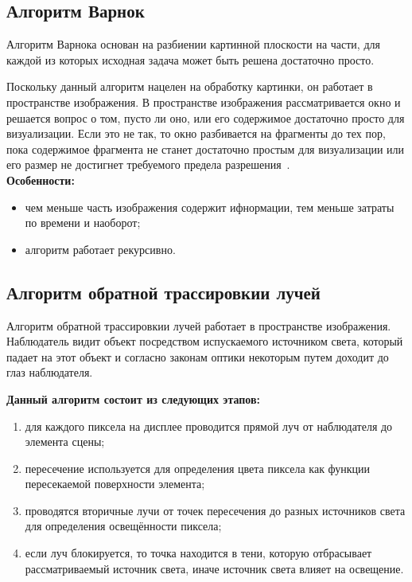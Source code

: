 \subsection{Алгоритм Варнок}

Алгоритм Варнока основан на разбиении картинной плоскости на части, для каждой из которых 
исходная задача может быть решена достаточно просто.

Поскольку данный алгоритм нацелен на обработку картинки, он работает в пространстве изображения. 
В пространстве изображения рассматривается окно и решается вопрос о том, пусто ли оно, или его содержимое 
достаточно просто для визуализации. Если это не так, то окно разбивается на фрагменты до тех пор, пока содержимое фрагмента
не станет достаточно простым для визуализации или его размер не достигнет требуемого предела разрешения~\cite{tpu}. \\

\textbf{Особенности:}
\begin{itemize}
    \item чем меньше часть изображения содержит ифнормации, тем меньше затраты по времени и наоборот;
    \item алгоритм работает рекурсивно.
\end{itemize}

\subsection{Алгоритм обратной трассировкии лучей}

Алгоритм обратной трассировкии лучей работает в пространстве изображения. 
Наблюдатель видит объект посредством испускаемого источником света, который падает 
на этот объект и согласно законам оптики некоторым путем доходит до глаз
наблюдателя.


\textbf{Данный алгоритм состоит из следующих этапов:}
\begin{enumerate}
    \item для каждого пиксела на дисплее проводится прямой луч от наблюдателя до элемента сцены;
    \item пересечение используется для определения цвета пиксела как функции пересекаемой
    поверхности элемента;
    \item проводятся вторичные лучи от точек пересечения до разных
    источников света для определения освещённости пиксела;
    \item если луч блокируется, то точка находится в тени, которую отбрасывает рассматриваемый источник света, иначе
    источник света влияет на освещение.
\end{enumerate}


